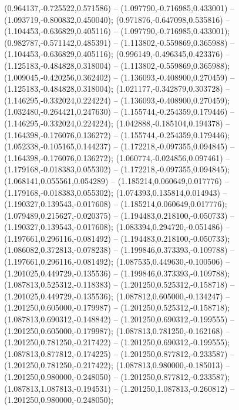  (0.964137,-0.725522,0.571586) -- (1.097790,-0.716985,0.433001) -- (1.093719,-0.800832,0.450040);
 (0.971876,-0.647098,0.535816) -- (1.104453,-0.636829,0.405116) -- (1.097790,-0.716985,0.433001);
 (0.982787,-0.571142,0.485391) -- (1.113802,-0.559869,0.365988) -- (1.104453,-0.636829,0.405116);
 (0.996149,-0.496345,0.423376) -- (1.125183,-0.484828,0.318004) -- (1.113802,-0.559869,0.365988);
 (1.009045,-0.420256,0.362402) -- (1.136093,-0.408900,0.270459) -- (1.125183,-0.484828,0.318004);
 (1.021177,-0.342879,0.303728) -- (1.146295,-0.332024,0.224224) -- (1.136093,-0.408900,0.270459);
 (1.032480,-0.264421,0.247630) -- (1.155744,-0.254359,0.179446) -- (1.146295,-0.332024,0.224224);
 (1.042888,-0.185104,0.194378) -- (1.164398,-0.176076,0.136272) -- (1.155744,-0.254359,0.179446);
 (1.052338,-0.105165,0.144237) -- (1.172218,-0.097355,0.094845) -- (1.164398,-0.176076,0.136272);
 (1.060774,-0.024856,0.097461) -- (1.179168,-0.018383,0.055302) -- (1.172218,-0.097355,0.094845);
 (1.068141,0.055561,0.054289) -- (1.185214,0.060649,0.017776) -- (1.179168,-0.018383,0.055302);
 (1.074393,0.135814,0.014943) -- (1.190327,0.139543,-0.017608) -- (1.185214,0.060649,0.017776);
 (1.079489,0.215627,-0.020375) -- (1.194483,0.218100,-0.050733) -- (1.190327,0.139543,-0.017608);
 (1.083394,0.294720,-0.051486) -- (1.197661,0.296116,-0.081492) -- (1.194483,0.218100,-0.050733);
 (1.086082,0.372813,-0.078238) -- (1.199846,0.373393,-0.109788) -- (1.197661,0.296116,-0.081492);
 (1.087535,0.449630,-0.100506) -- (1.201025,0.449729,-0.135536) -- (1.199846,0.373393,-0.109788);
 (1.087813,0.525312,-0.118383) -- (1.201250,0.525312,-0.158718) -- (1.201025,0.449729,-0.135536);
 (1.087812,0.605000,-0.134247) -- (1.201250,0.605000,-0.179987) -- (1.201250,0.525312,-0.158718);
 (1.087813,0.690312,-0.148842) -- (1.201250,0.690312,-0.199555) -- (1.201250,0.605000,-0.179987);
 (1.087813,0.781250,-0.162168) -- (1.201250,0.781250,-0.217422) -- (1.201250,0.690312,-0.199555);
 (1.087813,0.877812,-0.174225) -- (1.201250,0.877812,-0.233587) -- (1.201250,0.781250,-0.217422);
 (1.087813,0.980000,-0.185013) -- (1.201250,0.980000,-0.248050) -- (1.201250,0.877812,-0.233587);
 (1.087813,1.087813,-0.194531) -- (1.201250,1.087813,-0.260812) -- (1.201250,0.980000,-0.248050);
